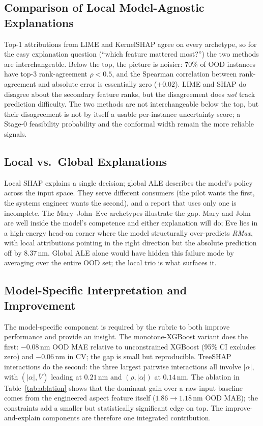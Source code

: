 \documentclass[conference]{IEEEtran}
\begin{document}
\subsection{Comparison of Local Model-Agnostic Explanations}
Top-1 attributions from LIME and KernelSHAP agree on every archetype, so for the easy explanation question (``which feature mattered most?'') the two methods are interchangeable. Below the top, the picture is noisier: $70\%$ of OOD instances have top-3 rank-agreement $\rho < 0.5$, and the Spearman correlation between rank-agreement and absolute error is essentially zero ($+0.02$). LIME and SHAP do disagree about the secondary feature ranks, but the disagreement does \emph{not} track prediction difficulty. The two methods are not interchangeable below the top, but their disagreement is not by itself a usable per-instance uncertainty score; a Stage-0 feasibility probability and the conformal width remain the more reliable signals.

\subsection{Local vs.\ Global Explanations}
Local SHAP explains a single decision; global ALE describes the model's policy across the input space. They serve different consumers (the pilot wants the first, the systems engineer wants the second), and a report that uses only one is incomplete. The Mary--John--Eve archetypes illustrate the gap. Mary and John are well inside the model's competence and either explanation will do; Eve lies in a high-energy head-on corner where the model structurally over-predicts \textit{RMax}, with local attributions pointing in the right direction but the absolute prediction off by $8.37$\,nm. Global ALE alone would have hidden this failure mode by averaging over the entire OOD set; the local trio is what surfaces it.

\subsection{Model-Specific Interpretation and Improvement}
The model-specific component is required by the rubric to both improve performance and provide an insight. The monotone-XGBoost variant does the first: $-0.08$\,nm OOD MAE relative to unconstrained XGBoost (95\% CI excludes zero) and $-0.06$\,nm in CV; the gap is small but reproducible. TreeSHAP interactions do the second: the three largest pairwise interactions all involve $|\alpha|$, with $(|\alpha|, \overline{V})$ leading at $0.21$\,nm and $(\rho, |\alpha|)$ at $0.14$\,nm. The ablation in Table~\ref{tab:ablation} shows that the dominant gain over a raw-input baseline comes from the engineered aspect feature itself ($1.86 \to 1.18$\,nm OOD MAE); the constraints add a smaller but statistically significant edge on top. The improve-and-explain components are therefore one integrated contribution.
\end{document}
